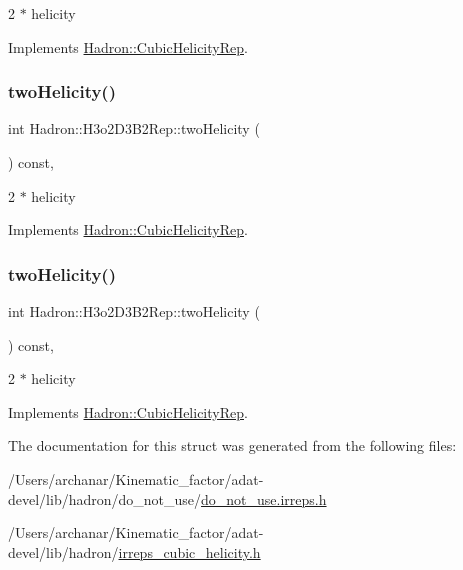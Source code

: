 2 $\ast$ helicity 

Implements \mbox{\hyperlink{structHadron_1_1CubicHelicityRep_af507aa56fc2747eacc8cb6c96db31ecc}{Hadron\+::\+Cubic\+Helicity\+Rep}}.

\mbox{\label{structHadron_1_1H3o2D3B2Rep_ad5a4c1e91f9852b28e13bb4813fe6e84}} 
\subsubsection{\texorpdfstring{twoHelicity()}{twoHelicity()}\hspace{0.1cm}{\footnotesize\ttfamily [2/3]}}
{\footnotesize\ttfamily int Hadron\+::\+H3o2\+D3\+B2\+Rep\+::two\+Helicity (\begin{DoxyParamCaption}{ }\end{DoxyParamCaption}) const\hspace{0.3cm}{\ttfamily [inline]}, {\ttfamily [virtual]}}

2 $\ast$ helicity 

Implements \mbox{\hyperlink{structHadron_1_1CubicHelicityRep_af507aa56fc2747eacc8cb6c96db31ecc}{Hadron\+::\+Cubic\+Helicity\+Rep}}.

\mbox{\label{structHadron_1_1H3o2D3B2Rep_ad5a4c1e91f9852b28e13bb4813fe6e84}} 
\subsubsection{\texorpdfstring{twoHelicity()}{twoHelicity()}\hspace{0.1cm}{\footnotesize\ttfamily [3/3]}}
{\footnotesize\ttfamily int Hadron\+::\+H3o2\+D3\+B2\+Rep\+::two\+Helicity (\begin{DoxyParamCaption}{ }\end{DoxyParamCaption}) const\hspace{0.3cm}{\ttfamily [inline]}, {\ttfamily [virtual]}}

2 $\ast$ helicity 

Implements \mbox{\hyperlink{structHadron_1_1CubicHelicityRep_af507aa56fc2747eacc8cb6c96db31ecc}{Hadron\+::\+Cubic\+Helicity\+Rep}}.



The documentation for this struct was generated from the following files\+:\begin{DoxyCompactItemize}
\item 
/\+Users/archanar/\+Kinematic\+\_\+factor/adat-\/devel/lib/hadron/do\+\_\+not\+\_\+use/\mbox{\hyperlink{adat-devel_2lib_2hadron_2do__not__use_2do__not__use_8irreps_8h}{do\+\_\+not\+\_\+use.\+irreps.\+h}}\item 
/\+Users/archanar/\+Kinematic\+\_\+factor/adat-\/devel/lib/hadron/\mbox{\hyperlink{adat-devel_2lib_2hadron_2irreps__cubic__helicity_8h}{irreps\+\_\+cubic\+\_\+helicity.\+h}}\end{DoxyCompactItemize}
